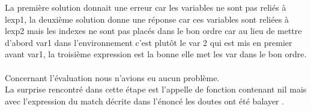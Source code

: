 \documentclass{article}
\begin{document}
\begin{enumerate}
    La première solution donnait une erreur car les variables ne sont pas reliés à lexp1, la deuxième solution donne une réponse car ces variables sont reliées à lexp2 mais les indexes ne sont pas placés dans le bon ordre car au lieu de mettre d’abord var1 dans l’environnement c’est plutôt le var 2 qui est mis en premier avant var1, la troisième expression est la bonne elle met les var dans le bon ordre.\\ \\
    Concernant l’évaluation nous n’avions eu aucun problème.\\
    La surprise rencontré dans cette étape est l’appelle de fonction contenant nil mais avec l’expression du match décrite dans l’énoncé les doutes ont été balayer .\\ \\
    


    
    
    
\end{enumerate}
\end{document}
